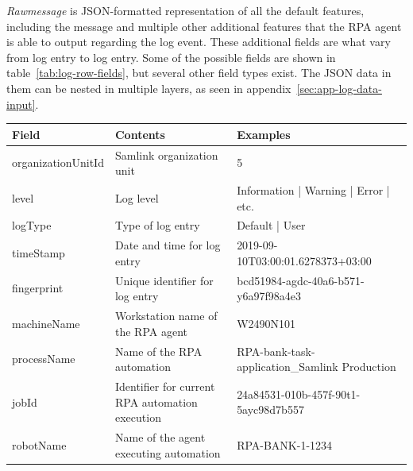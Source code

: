 \textit{Rawmessage} is JSON-formatted representation
of all the default features,
including the message
and multiple other additional features
that the RPA agent is able to output regarding the log event.
These additional fields are what vary from log entry to log entry.
Some of the possible fields are shown in table~\ref{tab:log-row-fields},
but several other field types exist.
The JSON data in them can be nested in multiple layers,
as seen in appendix~\ref{sec:app-log-data-input}.

\begin{table}[]
    \centering
    \begin{tabular}{|L{0.25\textwidth}|L{0.25\textwidth}|L{0.5\textwidth}|}
        \hline
        \textbf{Field}    & \textbf{Contents}                               & \textbf{Examples}                                                             \\ \hline
        organizationUnitId & Samlink organization unit                       & 5                                                                            \\ \hline
        level              & Log level                                       & Information | Warning | Error | etc.                                         \\ \hline
        logType            & Type of log entry                               & Default | User                                                               \\ \hline
        timeStamp          & Date and time for log entry                     & 2019-09-10T03:00:01.6278373+03:00                                            \\ \hline
        fingerprint        & Unique identifier for log entry                 & bcd51984-agdc-40a6-b571-y6a97f98a4e3                                         \\ \hline
        machineName        & Workstation name of the RPA agent               & W2490N101                                                                   \\ \hline
        processName        & Name of the RPA automation                      & RPA-bank-task-application\_Samlink Production                      \\ \hline
        jobId              & Identifier for current RPA automation execution & 24a84531-010b-457f-90t1-5ayc98d7b557                                         \\ \hline
        robotName          & Name of the agent executing automation          & RPA-BANK-1-1234                                                              \\ \hline

\end{tabular}
\end{table}
